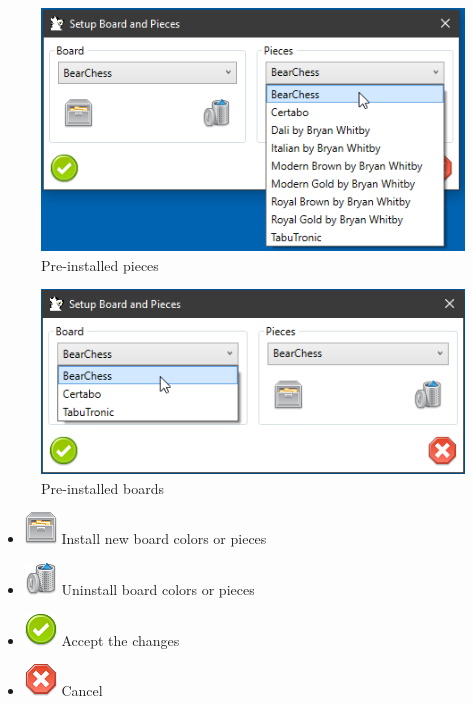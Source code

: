 \documentclass[11pt,a4paper]{article}
\begin{document}
	\begin{figure}[H]
		\centering
		\includegraphics[scale=0.9]{SettingsBoardAndPieces3.png}
		\caption{Pre-installed pieces }
		\label{fig:SettingsBoardAndPieces3}
	\end{figure}
	
	\begin{figure}[H]
		\centering
		\includegraphics[scale=0.9]{SettingsBoardAndPieces4.png}
		\caption{Pre-installed boards}
		\label{fig:SettingsBoardAndPieces4}
	\end{figure}
	
	
	\begin{itemize}
		\item \includegraphics[scale=0.5]{file_manager.png} Install new board colors or pieces
		\item \includegraphics[scale=0.5]{bin.png} Uninstall board colors or pieces
		\item \includegraphics[scale=0.5]{accept_button.png} Accept the changes
		\item \includegraphics[scale=0.5]{cancel.png} Cancel
	\end{itemize}
	
\end{document}
